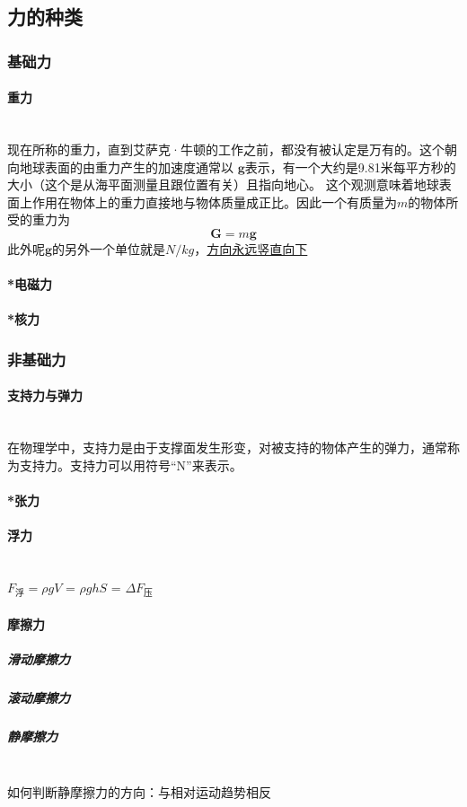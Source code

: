 \documentclass[a4paper, 11pt, oneside]{article}
\newcommand{\bol}[1]{\textbf{#1}}
\begin{document}
\subsection{力的种类}
\subsubsection{基础力}
\paragraph{重力}\quad\\
\indent 现在所称的重力，直到艾萨克·牛顿的工作之前，都没有被认定是万有的。这个朝向地球表面的由重力产生的加速度通常以 $\bol{g}$表示，有一个大约是9.81米每平方秒的大小（这个是从海平面测量且跟位置有关）且指向地心。 这个观测意味着地球表面上作用在物体上的重力直接地与物体质量成正比。因此一个有质量为$m$的物体所受的重力为
\begin{displaymath}
	\bol{G} = m\bol{g}
\end{displaymath}
此外呢$\bol{g}$的另外一个单位就是$N/kg$，\underline{方向永远竖直向下}
\paragraph{*电磁力}
\paragraph{*核力}
\subsubsection{非基础力}
\paragraph{支持力与弹力}\quad\\
在物理学中，支持力是由于支撑面发生形变，对被支持的物体产生的弹力，通常称为支持力。支持力可以用符号“N”来表示。
\paragraph{*张力}
\paragraph{浮力}\quad\\
$F_{\text{浮}} = \rho g V$ = $\rho g h S$ = $\Delta F_{\text{压}}$
\paragraph{摩擦力}
\subparagraph{滑动摩擦力}
\subparagraph{滚动摩擦力}
\subparagraph{静摩擦力}\quad\\
\indent 如何判断静摩擦力的方向：与相对运动趋势相反
\end{document}
